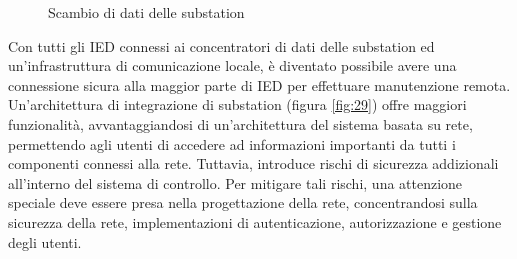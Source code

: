 \begin{figure}[h] 
\caption{Scambio di dati delle substation}\label{fig:28}
\end{figure}

Con tutti gli IED connessi ai concentratori di dati delle substation ed un'infrastruttura di comunicazione locale, è diventato possibile avere una connessione  sicura alla maggior parte di IED per effettuare manutenzione remota.
\\ 
Un'architettura di integrazione di substation (figura \ref{fig:29}) offre maggiori funzionalità, avvantaggiandosi di un'architettura del sistema basata su rete, permettendo agli utenti di accedere ad informazioni importanti da tutti i componenti connessi alla rete. Tuttavia, introduce rischi di sicurezza addizionali all'interno del sistema di controllo. Per mitigare tali rischi, una attenzione speciale deve essere presa nella progettazione della rete, concentrandosi sulla sicurezza della rete, implementazioni di autenticazione, autorizzazione e gestione degli utenti. 
 
